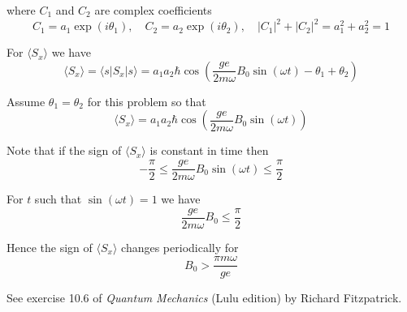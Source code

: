 where $C_1$ and $C_2$ are complex coefficients
\begin{equation*}
C_1=a_1\exp(i\theta_1),\quad C_2=a_2\exp(i\theta_2),\quad|C_1|^2+|C_2|^2=a_1^2+a_2^2=1
\end{equation*}

For $\langle S_x\rangle$ we have
\begin{equation*}
\langle S_x\rangle=\langle s|S_x|s\rangle
=a_1a_2\hbar\cos\left(\frac{ge}{2m\omega}B_0\sin(\omega t)-\theta_1+\theta_2\right)
\tag{2}
\end{equation*}

Assume $\theta_1=\theta_2$ for this problem so that
\begin{equation*}
\langle S_x\rangle=a_1a_2\hbar\cos\left(\frac{ge}{2m\omega}B_0\sin(\omega t)\right)
\end{equation*}

Note that if the sign of $\langle S_x\rangle$ is constant in time then
\begin{equation*}
-\frac{\pi}{2}\le\frac{ge}{2m\omega}B_0\sin(\omega t)\le\frac{\pi}{2}
\end{equation*}

For $t$ such that $\sin(\omega t)=1$ we have
\begin{equation*}
\frac{ge}{2m\omega}B_0\le\frac{\pi}{2}
\end{equation*}

Hence the sign of $\langle S_x\rangle$ changes periodically for
\begin{equation*}
B_0>\frac{\pi m\omega}{ge}
\end{equation*}

See exercise 10.6 of {\it Quantum Mechanics}
(Lulu edition) by Richard Fitzpatrick.


